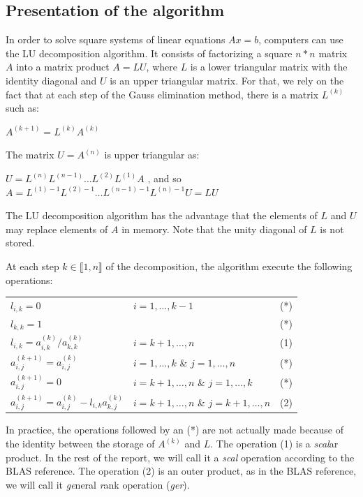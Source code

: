 \subsection*{Presentation of the algorithm \label{algo_lu}}
In order to solve square systems of linear equations $Ax=b$, computers can use the LU decomposition algorithm. It consists of factorizing a square $n*n$ matrix $A$  into a matrix product $A=LU$, where $L$ is a lower triangular matrix with the identity diagonal and $U$ is an upper triangular matrix. For that, we rely on the fact that at each step of the Gauss elimination method, there is a matrix $L^{(k)}$ such as:
\begin{center}
$A^{(k+1)} = L^{(k)}A^{(k)}$
\end{center}
The matrix $U=A^{(n)}$ is upper triangular as:
\begin{center}
$U=L^{(n)}L^{(n-1)}\dots L^{(2)}L^{(1)}A$ , and so\\
$A=L^{(1)-1}L^{(2)-1}\dots L^{(n-1)-1}L^{(n)-1}U=LU$
\end{center}
The LU decomposition algorithm has the advantage that the elements of $L$ and $U$ may replace elements of $A$ in memory. Note that the unity diagonal of $L$ is not stored.

At each step $k \in  \llbracket 1,n \rrbracket$ of the decomposition, the algorithm execute the following operations:
\begin{center}
\begin{tabular}{lll}
$l_{i,k} = 0$ & $i = 1,\dots , k-1$ & (*)\\
$l_{k,k} = 1$ & & (*)\\
$l_{i,k} = a_{i,k}^{(k)}/a_{k,k}^{(k)}$ & $i = k+1,\dots , n$ & (1)\\
$a_{i,j}^{(k+1)}=a_{i,j}^{(k)}$ & $i=1,\dots,k$ \& $j=1,\dots,n$ & (*)\\
$a_{i,j}^{(k+1)}=0$ & $i=k+1,\dots,n$ \& $j=1,\dots,k$ & (*)\\
$a_{i,j}^{(k+1)}=a_{i,j}^{(k)}-l_{i,k}a_{k,j}^{(k)}$ & $i=k+1,\dots,n$ \& $j=k+1,\dots,n$ & (2)\\
\end{tabular}
\end{center}
In practice, the operations followed by an (*) are not actually made because of the identity between the storage of $A^{(k)}$ and $L$. The operation (1) is a \emph{scal}ar product. In the rest of the report, we will call it a \emph{scal} operation according to the BLAS reference. The operation (2) is an outer product, as in the BLAS reference, we will call it \emph{ge}neral \emph{r}ank  operation (\emph{ger}).

